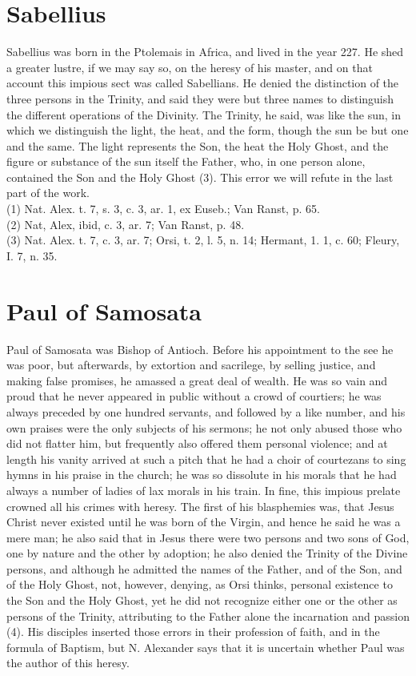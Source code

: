 \documentclass[12pt]{book}
\begin{document}
\section{Sabellius}
Sabellius was born in the Ptolemais in Africa, and lived in the year 227. He shed a greater lustre, if we
may say so, on the heresy of his master, and on that account this impious sect was called Sabellians. He
denied the distinction of the three persons in the Trinity, and said they were but three names to
distinguish the different operations of the Divinity. The Trinity, he said, was like the sun, in which we
distinguish the light, the heat, and the form, though the sun be but one and the same. The light represents
the Son, the heat the Holy Ghost, and the figure or substance of the sun itself the Father, who, in one
person alone, contained the Son and the Holy Ghost (3). This error we will refute in the last part of the
work.\\
(1) Nat. Alex. t. 7, s. 3, c. 3, ar. 1, ex Euseb.; Van Ranst, p. 65.\\
(2) Nat, Alex, ibid, c. 3, ar. 7; Van Ranst, p. 48.\\
(3) Nat. Alex. t. 7, c. 3, ar. 7; Orsi, t. 2, l. 5, n. 14; Hermant, 1. 1, c. 60; Fleury, I. 7, n. 35.
\section{Paul of Samosata}
Paul of Samosata was Bishop of Antioch. Before his appointment to the see he was poor, but
afterwards, by extortion and sacrilege, by selling justice, and making false promises, he amassed a great
deal of wealth. He was so vain and proud that he never appeared in public without a crowd of courtiers;
he was always preceded by one hundred servants, and followed by a like number, and his own praises
were the only subjects of his sermons; he not only abused those who did not flatter him, but frequently
also offered them personal violence; and at length his vanity arrived at such a pitch that he had a choir of
courtezans to sing hymns in his praise in the church; he was so dissolute in his morals that he had always
a number of ladies of lax morals in his train. In fine, this impious prelate crowned all his crimes with
heresy. The first of his blasphemies was, that Jesus Christ never existed until he was born of the Virgin,
and hence he said he was a mere man; he also said that in Jesus there were two persons and two sons of
God, one by nature and the other by adoption; he also denied the Trinity of the Divine persons, and
although he admitted the names of the Father, and of the Son, and of the Holy Ghost, not, however,
denying, as Orsi thinks, personal existence to the Son and the Holy Ghost, yet he did not recognize either
one or the other as persons of the Trinity, attributing to the Father alone the incarnation and passion (4).
His disciples inserted those errors in their profession of faith, and in the formula of Baptism, but N.
Alexander says that it is uncertain whether Paul was the author of this heresy.
\end{document}
